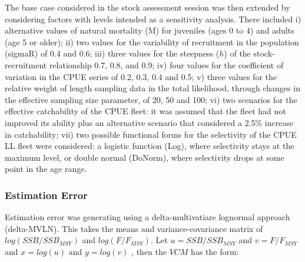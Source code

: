\documentclass[a4paper]{article}
\begin{document}
The base case considered in the stock assessment session was then extended by considering factors with levels intended as a sensitivity analysis. There included i) alternative values of natural mortality (M) for juveniles (ages 0 to 4) and adults (age 5 or older); ii) two values for the variability of recruitment in the population (sigmaR) of 0.4 and 0.6; iii) three values for the steepness ($h$) of the stock-recruitment relationship 0.7, 0.8, and 0.9; iv) four values for the coefficient of variation in the CPUE series of 0.2, 0.3, 0.4 and 0.5; v) three values for the relative weight of length sampling data in the total likelihood, through changes in the effective sampling size parameter, of 20, 50 and 100; vi) two scenarios for the effective catchability of the CPUE fleet: it was assumed that the fleet had not improved its ability plus an alternative scenario that considered a 2.5\% increase in catchability; vii) two possible functional forms for the selectivity of the CPUE LL fleet were considered: a logistic function (Log), where selectivity stays at the maximum level, or double normal (DoNorm), where selectivity drops at some point in the age range.


\subsubsection*{Estimation Error}

Estimation error was generating using a delta-multivatiare lognormal approach (delta-MVLN). This takes the means and variance-covariance matrix of $log(SSB/SSB_{MSY})$ and $log(F/F_{MSY})$. Let $u = SSB/SSB_{MSY}$ and $v = F/F_{MSY}$  and $x = log(u)$ and $y = log(v)$ , then the $VCM$ has the form:
    			
\end{document}
